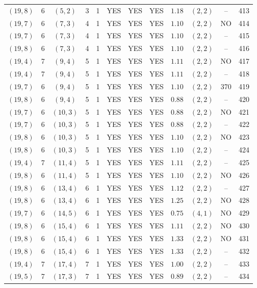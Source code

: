 \begin{longtable}{|c|c|c|c|c|c|c|c|c|c|c|c|}
$(19,8)$ & 6 & $(5,2)$ & 3 & 1 & YES & YES & YES & $1.18$ & $(2,2)$ & -- & 413\\
$(19,7)$ & 6 & $(7,3)$ & 4 & 1 & YES & YES & YES & $1.10$ & $(2,2)$ & NO & 414\\
$(19,7)$ & 6 & $(7,3)$ & 4 & 1 & YES & YES & YES & $1.10$ & $(2,2)$ & -- & 415\\
$(19,8)$ & 6 & $(7,3)$ & 4 & 1 & YES & YES & YES & $1.10$ & $(2,2)$ & -- & 416\\
$(19,4)$ & 7 & $(9,4)$ & 5 & 1 & YES & YES & YES & $1.11$ & $(2,2)$ & NO & 417\\
$(19,4)$ & 7 & $(9,4)$ & 5 & 1 & YES & YES & YES & $1.11$ & $(2,2)$ & -- & 418\\
$(19,7)$ & 6 & $(9,4)$ & 5 & 1 & YES & YES & YES & $1.10$ & $(2,2)$ & 370 & 419\\
$(19,8)$ & 6 & $(9,4)$ & 5 & 1 & YES & YES & YES & $0.88$ & $(2,2)$ & -- & 420\\
$(19,7)$ & 6 & $(10,3)$ & 5 & 1 & YES & YES & YES & $0.88$ & $(2,2)$ & NO & 421\\
$(19,7)$ & 6 & $(10,3)$ & 5 & 1 & YES & YES & YES & $0.88$ & $(2,2)$ & -- & 422\\
$(19,8)$ & 6 & $(10,3)$ & 5 & 1 & YES & YES & YES & $1.10$ & $(2,2)$ & NO & 423\\
$(19,8)$ & 6 & $(10,3)$ & 5 & 1 & YES & YES & YES & $1.10$ & $(2,2)$ & -- & 424\\
$(19,4)$ & 7 & $(11,4)$ & 5 & 1 & YES & YES & YES & $1.11$ & $(2,2)$ & -- & 425\\
$(19,8)$ & 6 & $(11,4)$ & 5 & 1 & YES & YES & YES & $1.10$ & $(2,2)$ & NO & 426\\
$(19,8)$ & 6 & $(13,4)$ & 6 & 1 & YES & YES & YES & $1.12$ & $(2,2)$ & -- & 427\\
$(19,8)$ & 6 & $(13,4)$ & 6 & 1 & YES & YES & YES & $1.25$ & $(2,2)$ & NO & 428\\
$(19,7)$ & 6 & $(14,5)$ & 6 & 1 & YES & YES & YES & $0.75$ & $(4,1)$ & NO & 429\\
$(19,8)$ & 6 & $(15,4)$ & 6 & 1 & YES & YES & YES & $1.11$ & $(2,2)$ & NO & 430\\
$(19,8)$ & 6 & $(15,4)$ & 6 & 1 & YES & YES & YES & $1.33$ & $(2,2)$ & NO & 431\\
$(19,8)$ & 6 & $(15,4)$ & 6 & 1 & YES & YES & YES & $1.33$ & $(2,2)$ & -- & 432\\
$(19,4)$ & 7 & $(17,4)$ & 7 & 1 & YES & YES & YES & $1.00$ & $(2,2)$ & -- & 433\\
$(19,5)$ & 7 & $(17,3)$ & 7 & 1 & YES & YES & YES & $0.89$ & $(2,2)$ & -- & 434\\

\end{longtable}
